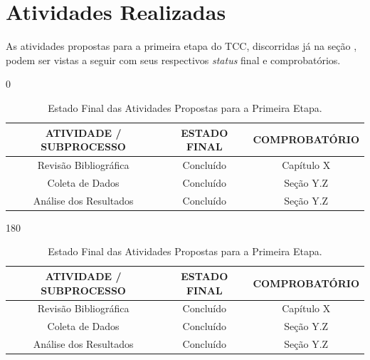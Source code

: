 \section{Atividades Realizadas}
\label{status-atividades-realizadas}

As atividades propostas para a primeira etapa do TCC, discorridas já na seção , podem ser vistas a seguir com seus respectivos \textit{status} final e comprobatórios.

\begin{table}
\centering
\ifodd\value{page}
\begin{turn}{0}
\begin{minipage}{\textwidth}
\centering
{\renewcommand{\arraystretch}{1.5}
\scriptsize
\caption[Estado Final das Atividades Primeira Etapa]{Estado Final das Atividades Propostas para a Primeira Etapa.}
\label{status-primeira-etapa}
\begin{tabular}{ccc}
\hline
\textbf{ATIVIDADE / SUBPROCESSO} & \textbf{ESTADO FINAL} & \textbf{COMPROBATÓRIO} \\ \hline
Revisão Bibliográfica & Concluído & Capítulo X \\ \hline
Coleta de Dados & Concluído & Seção Y.Z \\ \hline
Análise dos Resultados & Concluído & Seção Y.Z \\ \hline
\end{tabular}
}
\end{minipage}
\end{turn}
\else
\begin{turn}{180}
\begin{minipage}{\textwidth}
\centering
{\renewcommand{\arraystretch}{1.5}
\scriptsize
\caption[Estado Final das Atividades Primeira Etapa]{Estado Final das Atividades Propostas para a Primeira Etapa.}
\label{status-primeira-etapa}
\begin{tabular}{ccc}
\hline
\textbf{ATIVIDADE / SUBPROCESSO} & \textbf{ESTADO FINAL} & \textbf{COMPROBATÓRIO} \\ \hline
Revisão Bibliográfica & Concluído & Capítulo X \\ \hline
Coleta de Dados & Concluído & Seção Y.Z \\ \hline
Análise dos Resultados & Concluído & Seção Y.Z \\ \hline
\end{tabular}
}
\end{minipage}
\end{turn}
\fi
\end{table}

